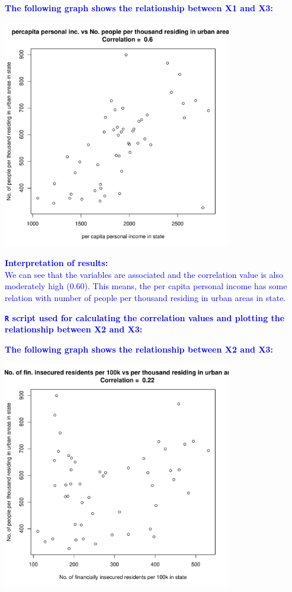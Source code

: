 \documentclass[12pt,letterpaper]{article}
\begin{document}
\begin{itemize}
\textcolor{blue}{
	\noindent \textbf{The following graph shows the relationship between X1 and X3:}
}
\begin{center}
	\includegraphics[width=10cm]{plot_X1_X3.pdf}  
\end{center}

\textcolor{blue}{
	\textbf{Interpretation of results:}\\
	We can see that the variables are associated and the correlation value is also moderately high (0.60). This means, the per capita personal income has some relation with number of people per thousand residing in urban areas in state.
}

\pagebreak

\textcolor{blue}{
	\noindent \textbf{\texttt{R} script used for calculating the correlation values and plotting the relationship between X2 and X3:}
}

  

\vspace{.25cm}

\textcolor{blue}{
	\noindent \textbf{The following graph shows the relationship between X2 and X3:}
}
\begin{center}
	\includegraphics[width=10cm]{plot_X2_X3.pdf}  
\end{center}


\end{itemize}
\end{document}
